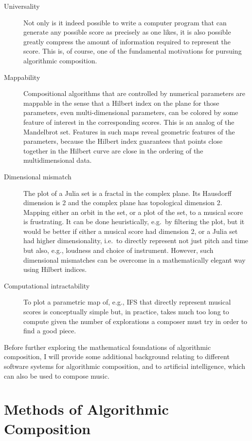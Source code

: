 \documentclass[11pt]{scrartcl}
\begin{document}
\begin{description}
\item[Universality] Not only is it indeed possible to write a computer program that can generate any possible score as precisely as one likes, it is also possible greatly compress the amount of information required to represent the score. This is, of course, one of the fundamental motivations for pursuing algorithmic composition.
\item[Mappability] Compositional algorithms that are controlled by numerical parameters are mappable in the sense that a Hilbert index on the plane for those parameters, even multi-dimensional parameters, can be colored by some feature of interest in the corresponding scores. This is an analog of the Mandelbrot set. Features in such maps reveal geometric features of the parameters, because the Hilbert index guarantees that points close together in the Hilbert curve are close in the ordering of the multidimensional data.
\item[Dimensional mismatch] The plot of a Julia set is a fractal in the complex plane. Its Hausdorff dimension is 2 and the complex plane has topological dimension 2. Mapping either an orbit in the set, or a plot of the set, to a musical score is frustrating. It can be done heuristically, e.g.\ by filtering the plot, but it would be better if either a musical score had dimension 2, or a Julia set had higher dimensionality, i.e.\ to directly represent not just pitch and time but also, e.g., loudness and choice of instrument. However, such  dimensional mismatches can be overcome in a mathematically elegant way using Hilbert indices. 
\item[Computational intractability] To plot a parametric map of, e.g., IFS that directly represent musical scores is conceptually simple but, in practice, takes much too long to compute given the number of explorations a composer must try in order to find a good piece.
\end{description}

Before further exploring the mathematical foundations of algorithmic composition, I will provide some additional background relating to different software systems for algorithmic composition, and to artificial intelligence, which can also be used to compose music.

\section{Methods of Algorithmic Composition}
\end{document}
